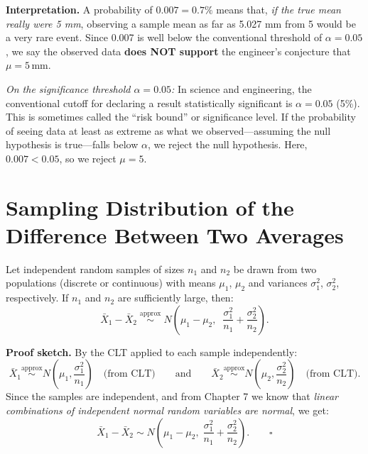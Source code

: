 \documentclass[10pt]{report}
\begin{document}
\textbf{Interpretation.} A probability of $0.007 = 0.7\%$ means that, \emph{if the true mean really were 5 mm}, observing a sample mean as far as 5.027 mm from 5 would be a very rare event. Since 0.007 is well below the conventional threshold of $\alpha = 0.05$, we say the observed data \textbf{does NOT support} the engineer's conjecture that $\mu = 5\,\text{mm}$.

\medskip

\textit{On the significance threshold $\alpha = 0.05$:} In science and engineering, the conventional cutoff for declaring a result statistically significant is $\alpha = 0.05$ (5\%). This is sometimes called the ``risk bound'' or significance level. If the probability of seeing data at least as extreme as what we observed---assuming the null hypothesis is true---falls below $\alpha$, we reject the null hypothesis. Here, $0.007 < 0.05$, so we reject $\mu = 5$.

\bigskip

\section{Sampling Distribution of the Difference Between Two Averages}

\begin{tcolorbox}[colback=softpink!15, colframe=softpink!60!black, title=Theorem: Two-Sample Difference of Means]
Let independent random samples of sizes $n_1$ and $n_2$ be drawn from two populations (discrete or continuous) with means $\mu_1$, $\mu_2$ and variances $\sigma_1^2$, $\sigma_2^2$, respectively. If $n_1$ and $n_2$ are sufficiently large, then:
\[
\bar{X}_1 - \bar{X}_2 \;\overset{\text{approx}}{\sim}\; N\!\left(\mu_1 - \mu_2,\;\; \frac{\sigma_1^2}{n_1} + \frac{\sigma_2^2}{n_2}\right).
\]
\end{tcolorbox}

\textbf{Proof sketch.} By the CLT applied to each sample independently:
\[
\bar{X}_1 \overset{\text{approx}}{\sim} N\!\left(\mu_1, \frac{\sigma_1^2}{n_1}\right) \quad \text{(from CLT)}
\qquad \text{and} \qquad
\bar{X}_2 \overset{\text{approx}}{\sim} N\!\left(\mu_2, \frac{\sigma_2^2}{n_2}\right) \quad \text{(from CLT).}
\]
Since the samples are independent, and from Chapter 7 we know that \emph{linear combinations of independent normal random variables are normal}, we get:
\[
\bar{X}_1 - \bar{X}_2 \sim N\!\left(\mu_1 - \mu_2,\; \frac{\sigma_1^2}{n_1} + \frac{\sigma_2^2}{n_2}\right). \qquad \square
\]
\end{document}
